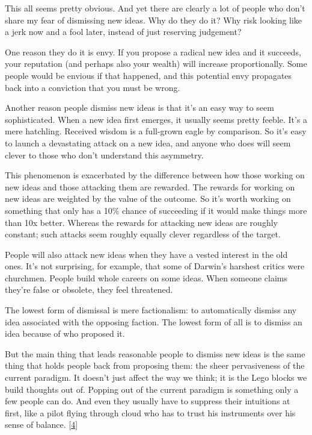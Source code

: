 This all seems pretty obvious. And yet there are clearly a lot of people
who don't share my fear of dismissing new ideas. Why do they do it? Why
risk looking like a jerk now and a fool later, instead of just reserving
judgement?

One reason they do it is envy. If you propose a radical new idea and it
succeeds, your reputation (and perhaps also your wealth) will increase
proportionally. Some people would be envious if that happened, and this
potential envy propagates back into a conviction that you must be wrong.

Another reason people dismiss new ideas is that it's an easy way to seem
sophisticated. When a new idea first emerges, it usually seems pretty
feeble. It's a mere hatchling. Received wisdom is a full-grown eagle by
comparison. So it's easy to launch a devastating attack on a new idea,
and anyone who does will seem clever to those who don't understand this
asymmetry.

This phenomenon is exacerbated by the difference between how those
working on new ideas and those attacking them are rewarded. The rewards
for working on new ideas are weighted by the value of the outcome. So
it's worth working on something that only has a 10\% chance of
succeeding if it would make things more than 10x better. Whereas the
rewards for attacking new ideas are roughly constant; such attacks seem
roughly equally clever regardless of the target.

People will also attack new ideas when they have a vested interest in
the old ones. It's not surprising, for example, that some of Darwin's
harshest critics were churchmen. People build whole careers on some
ideas. When someone claims they're false or obsolete, they feel
threatened.

The lowest form of dismissal is mere factionalism: to automatically
dismiss any idea associated with the opposing faction. The lowest form
of all is to dismiss an idea because of who proposed it.

But the main thing that leads reasonable people to dismiss new ideas is
the same thing that holds people back from proposing them: the sheer
pervasiveness of the current paradigm. It doesn't just affect the way we
think; it is the Lego blocks we build thoughts out of. Popping out of
the current paradigm is something only a few people can do. And even
they usually have to suppress their intuitions at first, like a pilot
flying through cloud who has to trust his instruments over his sense of
balance. {[}\hyperref[f4n]{4}{]}


